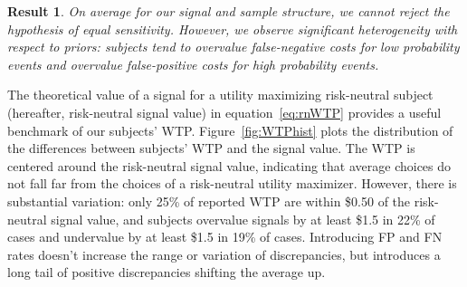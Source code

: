 \documentclass[12pt,a4paper]{article}
\newtheorem{result}{Result}
\begin{document}
\begin{result} 
On average for our signal and sample structure, we cannot reject the hypothesis of equal sensitivity. However, we observe significant heterogeneity with respect to priors: subjects tend to overvalue false-negative costs for low probability events and overvalue false-positive costs for high probability events. 
\end{result}





%

The theoretical value of a signal for a utility maximizing risk-neutral subject (hereafter, risk-neutral signal value) in equation~\ref{eq:rnWTP} provides a useful benchmark of our subjects' WTP. Figure~\ref{fig:WTPhist} plots the distribution of the differences between subjects' WTP and the signal value.  
The WTP is centered around the risk-neutral signal value, indicating that average choices do not fall far from the choices of a risk-neutral utility maximizer. However, there is substantial variation: only 25\% of reported WTP are within \$0.50 of the risk-neutral signal value, and subjects overvalue signals by at least \$1.5 in 22\% of cases and undervalue by at least \$1.5 in 19\% of cases. Introducing FP and FN rates doesn't increase the range or variation of discrepancies, but introduces a long tail of positive discrepancies shifting the average up.
\end{document}
